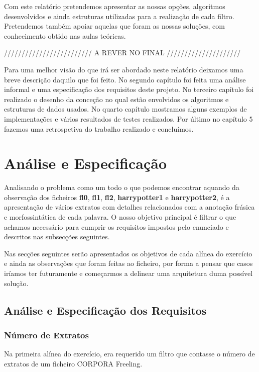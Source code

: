 \documentclass[11pt,a4paper]{report}
\begin{document}
Com este relatório pretendemos apresentar as nossas opções, algoritmos desenvolvidos e ainda estruturas utilizadas para a realização de cada filtro. Pretendemos também apoiar aquelas que foram as nossas soluções, com conhecimento obtido nas aulas teóricas.

///////////////////////// A REVER NO FINAL /////////////////////

Para uma melhor visão do que irá ser abordado neste relatório deixamos uma breve descrição daquilo que foi feito. No segundo capítulo foi feita uma análise informal e uma especificação dos requisitos deste projeto. No terceiro capítulo foi realizado o desenho da conceção no qual estão envolvidos os algoritmos e estruturas de dados usados. No quarto capítulo mostramos alguns exemplos de implementações e vários resultados de testes realizados. Por último no capítulo 5 fazemos uma retrospetiva do trabalho realizado e concluímos.



\chapter{Análise e Especificação}
\label{chap:analise}

Analisando o problema como um todo o que podemos encontrar aquando da observação dos ficheiros \textbf{fl0}, \textbf{fl1}, \textbf{fl2}, \textbf{harrypotter1} e \textbf{harrypotter2}, é a apresentação de vários extratos com detalhes relacionados com a anotação frásica e morfossintática de cada palavra. O nosso objetivo principal é filtrar o que achamos necessário para cumprir os requisitos impostos pelo enunciado e descritos nas subsecções seguintes.

Nas secções seguintes serão apresentados os objetivos de cada alínea do exercício e ainda as observações que foram feitas ao ficheiro, por forma a pensar que casos iríamos ter futuramente e começarmos a delinear uma arquitetura duma possível solução.

\section{Análise e Especificação dos Requisitos}
\subsection{Número de Extratos}
\label{subsec:analise1}

Na primeira alínea do exercício, era requerido um filtro que contasse o número de extratos de um ficheiro CORPORA Freeling.
\end{document}
